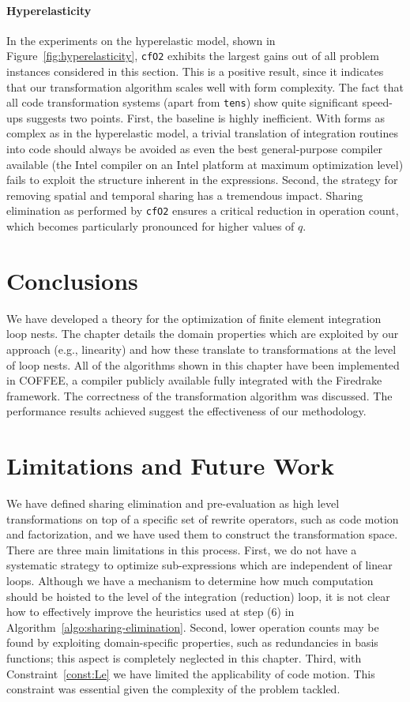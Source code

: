 \paragraph{Hyperelasticity}
In the experiments on the hyperelastic model, shown in Figure~\ref{fig:hyperelasticity}, \texttt{cfO2} exhibits the largest gains out of all problem instances considered in this section. This is a positive result, since it indicates that our transformation algorithm scales well with form complexity. The fact that all code transformation systems (apart from \texttt{tens}) show quite significant speed-ups suggests two points. First, the baseline is highly inefficient. With forms as complex as in the hyperelastic model, a trivial translation of integration routines into code should always be avoided as even the best general-purpose compiler available (the Intel compiler on an Intel platform at maximum optimization level) fails to exploit the structure inherent in the expressions. Second, the strategy for removing spatial and temporal sharing has a tremendous impact. Sharing elimination as performed by \texttt{cfO2} ensures a critical reduction in operation count, which becomes particularly pronounced for higher values of $q$. 

\section{Conclusions}
\label{sec:conclusions}
We have developed a theory for the optimization of finite element integration loop nests. The chapter details the domain properties which are exploited by our approach (e.g., linearity) and how these translate to transformations at the level of loop nests. All of the algorithms shown in this chapter have been implemented in COFFEE, a compiler publicly available fully integrated with the Firedrake framework. The correctness of the transformation algorithm was discussed. The performance results achieved suggest the effectiveness of our methodology. 

\section{Limitations and Future Work}
\label{sec:completeness}
We have defined sharing elimination and pre-evaluation as high level transformations on top of a specific set of rewrite operators, such as code motion and factorization, and we have used them to construct the transformation space. There are three main limitations in this process. First, we do not have a systematic strategy to optimize sub-expressions which are independent of linear loops. Although we have a mechanism to determine how much computation should be hoisted to the level of the integration (reduction) loop, it is not clear how to effectively improve the heuristics used at step (6) in Algorithm~\ref{algo:sharing-elimination}. Second, lower operation counts may be found by exploiting domain-specific properties, such as redundancies in basis functions; this aspect is completely neglected in this chapter. Third, with Constraint~\ref{const:Le} we have limited the applicability of code motion. This constraint was essential given the complexity of the problem tackled. 

